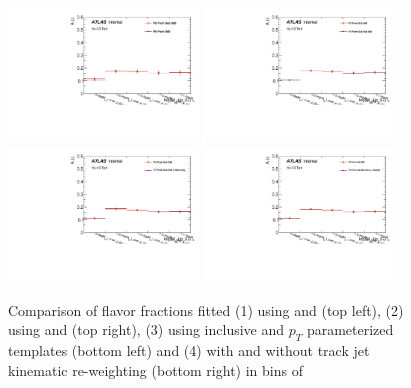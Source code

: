 \begin{figure}[htbp]
  \centering
 \includegraphics[width=0.45\textwidth]{figures/gbb/Sub_Sd0_Fits/Canv_fracmasspt_leadCrossCheck.pdf}
 \includegraphics[width=0.45\textwidth]{figures/gbb/Sub_Sd0_Fits/Canv_fracmasspt_subsubCrossCheck.pdf}\\
 \includegraphics[width=0.45\textwidth]{figures/gbb/Sub_Sd0_Fits/Canv_fracmasspt_ptbinCrossCheck.pdf}
 \includegraphics[width=0.45\textwidth]{figures/gbb/Sub_Sd0_Fits/Canv_fracmasspt_noreweightCrossCheck.pdf}\\
\caption{Comparison of flavor fractions fitted (1) using \subsdzero and \sdzero (top left), (2) using \subsdzero and \subsubsdzero (top right), (3) using inclusive and $p_T$ parameterized templates (bottom left) and (4) with and without track jet kinematic re-weighting (bottom right) in bins of \mpt}
  \label{fig:fracmasspt-fitfrac-crosscheck}
\end{figure}

